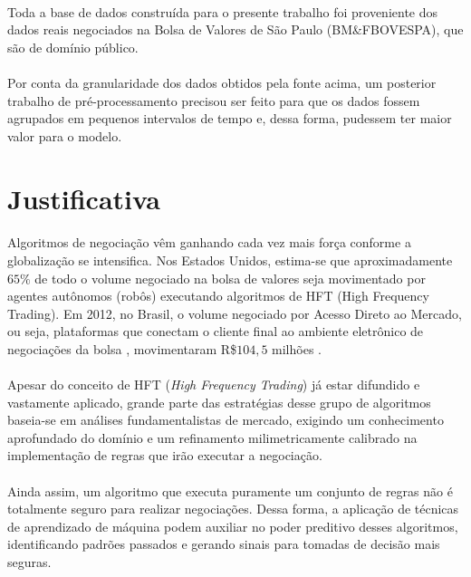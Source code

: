 \documentclass[grad,numbers]{coppe}
\begin{document}
    \paragraph{}Toda a base de dados construída para o presente trabalho foi proveniente dos dados reais negociados na Bolsa de Valores de São Paulo (BM\&FBOVESPA), que são de domínio público. 
    
    \paragraph{}Por conta da granularidade dos dados obtidos pela fonte acima, um posterior trabalho de pré-processamento precisou ser feito para que os dados fossem agrupados em pequenos intervalos de tempo e, dessa forma, pudessem ter maior valor para o modelo.
  
  \section{Justificativa}
  
    \paragraph{}Algoritmos de negociação vêm ganhando cada vez mais força conforme a globalização se intensifica. Nos Estados Unidos, estima-se que aproximadamente ${65\%}$ de todo o volume negociado na bolsa de valores seja movimentado por agentes autônomos (robôs) executando algoritmos de HFT (High Frequency Trading). Em 2012, no Brasil, o volume negociado por Acesso Direto ao Mercado, ou seja, plataformas que conectam o cliente final ao ambiente eletrônico de negociações da bolsa \cite{parceiros-dma}, movimentaram R\$$104,5$ milhões \cite{moreno-hft}. 
  
    \paragraph{}Apesar do conceito de HFT (\textit{High Frequency Trading}) já estar difundido e vastamente aplicado, grande parte das estratégias desse grupo de algoritmos baseia-se em análises fundamentalistas de mercado, exigindo um conhecimento aprofundado do domínio e um refinamento milimetricamente calibrado na implementação de regras que irão executar a negociação. 
    
    \paragraph{}Ainda assim, um algoritmo que executa puramente um conjunto de regras não é totalmente seguro para realizar negociações. Dessa forma, a aplicação de técnicas de aprendizado de máquina podem auxiliar no poder preditivo desses algoritmos, identificando padrões passados e gerando sinais para tomadas de decisão mais seguras.
    
\end{document}

